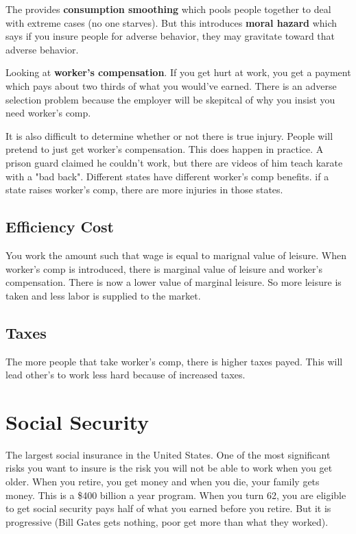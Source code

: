\documentclass{article}
\begin{document}
The provides \textbf{consumption smoothing} which pools people together to deal
with extreme cases (no one starves). But this introduces \textbf{moral hazard}
which says if you insure people for adverse behavior, they may gravitate toward
that adverse behavior. 

Looking at \textbf{worker's compensation}. If you get hurt at work, you get a
payment which pays about two thirds of what you would've earned. There is an
adverse selection problem because the employer will be skepitcal of why you
insist you need worker's comp. 

It is also difficult to determine whether or not there is true injury. People
will pretend to just get worker's compensation. This does happen in practice. A
prison guard claimed he couldn't work, but there are videos of him teach karate
with a "bad back". Different states have different worker's comp benefits. if a
state raises worker's comp, there are more injuries in those states. 

\subsection{ Efficiency Cost }

You work the amount such that wage is equal to marignal value of leisure. When
worker's comp is introduced, there is marginal value of leisure and worker's
compensation. There is now a lower value of marginal leisure. So more leisure is
taken and less labor is supplied to the market. 

\subsection{ Taxes }

The more people that take worker's comp, there is higher taxes payed. This will
lead other's to work less hard because of increased taxes. 

\section{ Social Security }

The largest social insurance in the United States. One of the most significant
risks you want to insure is the risk you will not be able to work when you get
older. When you retire, you get money and when you die, your family gets money.
This is a \$400 billion a year program. When you turn 62, you are eligible to
get social security pays half of what you earned before you retire. But it is
progressive (Bill Gates gets nothing, poor get more than what they worked). 
\end{document}
